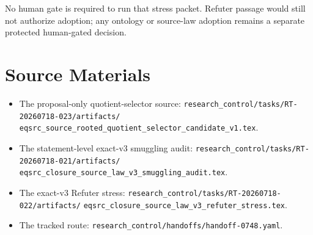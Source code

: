 \documentclass[11pt]{article}
\begin{document}
No human gate is required to run that stress packet.  Refuter passage would
still not authorize adoption; any ontology or source-law adoption remains a
separate protected human-gated decision.

\section{Source Materials}

\begin{itemize}[leftmargin=*]
  \item The proposal-only quotient-selector source:
  \texttt{research\_control/tasks/RT-20260718-023/artifacts/}
  \texttt{eqsrc\_source\_rooted\_quotient\_selector\_candidate\_v1.tex}.
  \item The statement-level exact-v3 smuggling audit:
  \texttt{research\_control/tasks/RT-20260718-021/artifacts/}
  \texttt{eqsrc\_closure\_source\_law\_v3\_smuggling\_audit.tex}.
  \item The exact-v3 Refuter stress:
  \texttt{research\_control/tasks/RT-20260718-022/artifacts/}
  \texttt{eqsrc\_closure\_source\_law\_v3\_refuter\_stress.tex}.
  \item The tracked route:
  \texttt{research\_control/handoffs/handoff-0748.yaml}.
\end{itemize}
\end{document}
